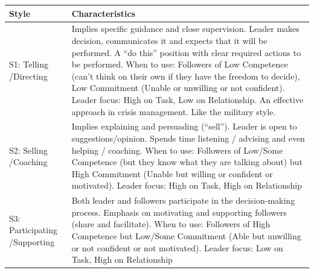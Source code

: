 \documentclass[]{project_plan}
\begin{document}
\begin{tabular}{|p{30mm}|p{115mm}|}
  \hline
  Style                           & Characteristics                                                                                                                                                                                                                                                                                                                                                                                                                                                                                         \\
  \hline
  S1: Telling \newline /Directing & Implies specific guidance and close supervision. Leader makes decision, communicates it and expects that it will be performed. A “do this” position with clear required actions to be performed. \newline When to use: Followers of Low Competence (can't think on their own if they have the freedom to decide), Low Commitment (Unable or unwilling or not confident). \newline Leader focus: High on Task, Low on Relationship. An effective approach in crisis management. Like the military style. \\
  \hline
  S2: Selling /Coaching           & Implies explaining and persuading (“sell”). Leader is open to suggestions/opinion. Spends time listening / advising and even helping / coaching. \newline When to use: Followers of Low/Some Competence (but they know what they are talking about) but High Commitment (Unable but willing or confident or motivated). \newline Leader focus: High on Task, High on Relationship                                                                                                                       \\
  \hline
  S3: Participating /Supporting   & Both leader and followers participate in the decision-making process. Emphasis on motivating and supporting followers (share and facilitate). \newline When to use: Followers of High Competence but Low/Some Commitment (Able but unwilling or not confident or not motivated). \newline Leader focus: Low on Task, High on Relationship                                                                                                                                                               \\

\end{tabular}
\end{document}
